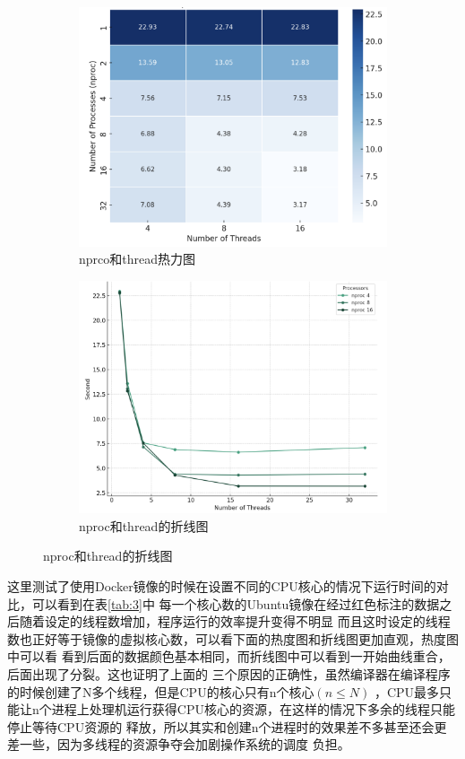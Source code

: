 \documentclass{article}
\begin{document}
\begin{figure}[H]
    \centering
    \begin{subfigure}[b]{0.45\textwidth}
        \centering
        \includegraphics[width=\textwidth]{heatmap.png}
        \caption{nprco和thread热力图}
    \end{subfigure}
    \hfill
    \begin{subfigure}[b]{0.45\textwidth}
        \centering
        \includegraphics[width=\textwidth]{statistic.png}
        \caption{nproc和thread的折线图}
    \end{subfigure} 
\end{figure}

这里测试了使用Docker镜像的时候在设置不同的CPU核心的情况下运行时间的对比，可以看到在表\ref{tab:3}中
每一个核心数的Ubuntu镜像在经过红色标注的数据之后随着设定的线程数增加，程序运行的效率提升变得不明显
而且这时设定的线程数也正好等于镜像的虚拟核心数，可以看下面的热度图和折线图更加直观，热度图中可以看
看到后面的数据颜色基本相同，而折线图中可以看到一开始曲线重合，后面出现了分裂。这也证明了上面的
三个原因的正确性，虽然编译器在编译程序的时候创建了N多个线程，但是CPU的核心只有n个核心$(n \leq N)$
，CPU最多只能让n个进程上处理机运行获得CPU核心的资源，在这样的情况下多余的线程只能停止等待CPU资源的
释放，所以其实和创建n个进程时的效果差不多甚至还会更差一些，因为多线程的资源争夺会加剧操作系统的调度
负担。
\end{document}
